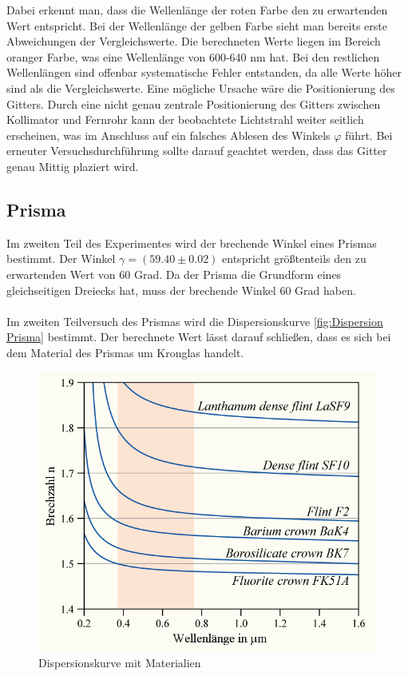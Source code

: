 \documentclass[12pt,a4paper,twoside]{article}
\begin{document}
\noindent
Dabei erkennt man, dass die Wellenlänge der roten Farbe den zu erwartenden Wert entspricht. 
Bei der Wellenlänge der gelben Farbe sieht man bereits erste Abweichungen der Vergleichswerte. Die berechneten Werte liegen im Bereich oranger Farbe, was eine Wellenlänge von 600-640 nm hat. 
Bei den restlichen Wellenlängen sind offenbar systematische Fehler entstanden, da alle Werte höher sind als die Vergleichswerte. Eine mögliche Ursache wäre die Positionierung des Gitters. 
Durch eine nicht genau zentrale Positionierung des Gitters zwischen Kollimator und Fernrohr kann der beobachtete Lichtstrahl weiter seitlich erscheinen, was im Anschluss auf ein falsches Ablesen des Winkels $\varphi$ führt.
Bei erneuter Versuchsdurchführung sollte darauf geachtet werden, dass das Gitter genau Mittig plaziert wird. 

\subsection{Prisma}
Im zweiten Teil des Experimentes wird der brechende Winkel eines Prismas bestimmt. Der Winkel $\gamma = (59.40 \pm 0.02)$ entspricht größtenteils den zu erwartenden Wert von 60 Grad. 
Da der Prisma die Grundform eines gleichseitigen Dreiecks hat, muss der brechende Winkel 60 Grad haben. 
\\
\\
Im zweiten Teilversuch des Prismas wird die Dispersionskurve \ref{fig:Dispersion Prisma} bestimmt. 
Der berechnete Wert lässt darauf schließen, dass es sich bei dem Material des Prismas um Kronglas handelt. 

\begin{figure}[H]
    \centering
    \includegraphics[width=0.6\linewidth]{nudes/Dispersionskurve.png}
    \caption{Dispersionskurve mit Materialien \cite{wiki2}}
    \label{fig:Literatur Prisma}
\end{figure}
\end{document}
